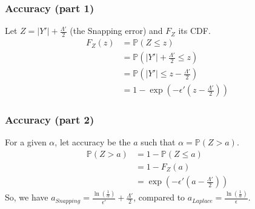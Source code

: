 \documentclass{beamer}
\begin{document}
\begin{frame}
    \frametitle{Accuracy (part 1)}
    Let $Z = \vert Y' \vert + \frac{\Lambda'}{2}$ (the Snapping error) and $F_Z$ its CDF.
    \begin{align}
        F_{Z}(z) &= \mathbb{P}(Z \leq z) \nonumber \\
                 &= \mathbb{P}\left( \vert Y' \vert + \frac{\Lambda'}{2} \leq z \right) \nonumber \\
                 &= \mathbb{P} \left( \vert Y' \vert \leq z - \frac{\Lambda'}{2} \right) \nonumber \\
                 &= 1 - \exp\left( -\epsilon'(z - \frac{\Lambda'}{2}) \right) \nonumber
    \end{align}
\end{frame}
\begin{frame}
    \frametitle{Accuracy (part 2)}
    For a given $\alpha$, let accuracy be the $a$ such that $\alpha = \mathbb{P}(Z > a)$.
    \begin{align*}
        \mathbb{P}(Z > a) &= 1 - \mathbb{P}(Z \leq a) \\
                     &= 1 - F_{Z}(a) \\
                     &= \exp\left( -\epsilon'(a - \frac{\Lambda'}{2}) \right)
    \end{align*}
    So, we have $a_{Snapping} = \frac{\ln \left( \frac{1}{\alpha} \right)}{\epsilon'} + \frac{\Lambda'}{2}$,
    compared to
    $a_{Laplace} = \frac{\ln \left( \frac{1}{\alpha} \right)}{\epsilon}$.
\end{frame}
\end{document}
